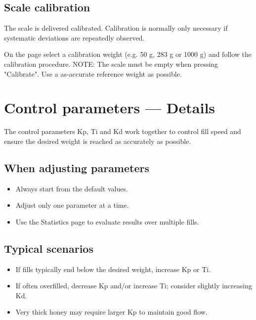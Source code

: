 \documentclass[11pt,a4paper]{article}
\begin{document}
\subsection{Scale calibration}

The scale is delivered calibrated. Calibration is normally only necessary if systematic deviations are repeatedly observed.

On the page select a calibration weight (e.g. 50 g, 283 g or 1000 g) and follow the calibration procedure. NOTE: The scale must be empty when pressing "Calibrate". Use a as-accurate reference weight as possible.

\newpage

\section{Control parameters — Details}

The control parameters Kp, Ti and Kd work together to control fill speed and ensure the desired weight is reached as accurately as possible.

\subsection*{When adjusting parameters}

\begin{itemize}[leftmargin=*]
    \item Always start from the default values.
    \item Adjust only one parameter at a time.
    \item Use the Statistics page to evaluate results over multiple fills.
\end{itemize}

\subsection*{Typical scenarios}

\begin{itemize}[leftmargin=*]
    \item If fills typically end below the desired weight, increase Kp or Ti.
    \item If often overfilled, decrease Kp and/or increase Ti; consider slightly increasing Kd.
    \item Very thick honey may require larger Kp to maintain good flow.
\end{itemize}
\end{document}
